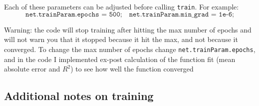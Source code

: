 \documentclass[a4paper,12pt]{article}
\newcommand{\code}[1]{\texttt{#1}}
\begin{document}
Each of these parameters can be adjusted before calling \code{train}. For example:
\[
\code{net.trainParam.epochs = 500;} \quad
\code{net.trainParam.min\_grad = 1e{-6};}
\]

Warning: the code will stop training after hitting the max number of epochs and will not warn you that it stopped because it hit the max, and not because it converged. To change the max number of epochs change \code{net.trainParam.epochs}, and in the code I implemented ex-post calculation of the function fit (mean absolute error and $R^2$) to see how well the function converged



\subsection{Additional notes on training}
\end{document}
